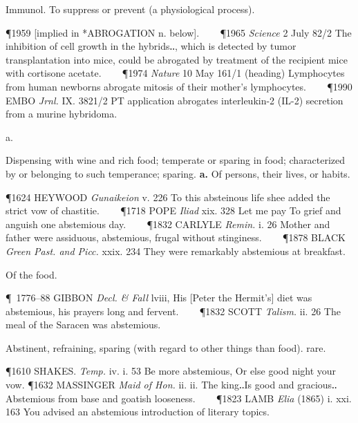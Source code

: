 \begin{description}[wide, labelwidth=!, labelindent=0pt]
\begin{myenumerate}
 Immunol. To suppress or prevent (a physiological process). 

\P 1959 [implied in *ABROGATION n. below].    
\P 1965 \textit{Science} 2 July 82/2 The
inhibition of cell growth in the hybrids‥, which is detected by tumor
transplantation into mice, could be abrogated by treatment of the recipient mice
with cortisone acetate.    
\P 1974 \textit{Nature} 10 May 161/1 (heading) Lymphocytes from
human newborns abrogate mitosis of their mother's lymphocytes.    
\P 1990 EMBO \textit{Jrnl.} IX. 3821/2 PT application abrogates interleukin-2 (IL-2) secretion from a
murine hybridoma.
\end{myenumerate}

 a.

\noindent {}

\vspace{-0.3cm}

\begin{myenumerate}
 Dispensing with wine and rich food; temperate or sparing in food;
characterized by or belonging to such temperance; sparing. \textbf{a.} Of persons,
their lives, or habits. 

\P 1624 HEYWOOD \textit{Gunaikeion} v. 226 To this absteinous life shee added the strict
vow of chastitie.    
\P 1718 POPE \textit{Iliad} xix. 328 Let me pay To grief and anguish
one abstemious day.    
\P 1832 CARLYLE \textit{Remin.} i. 26 Mother and father were
assiduous, abstemious, frugal without stinginess.    
\P 1878 BLACK \textit{Green Past. and Picc.} xxix. 234 They were remarkably abstemious at breakfast.

 Of the food. 

\P 1776–88 GIBBON \textit{Decl. \& Fall} lviii, His [Peter the Hermit's] diet was
abstemious, his prayers long and fervent.    
\P 1832 SCOTT \textit{Talism.} ii. 26 The meal of the Saracen was abstemious.

 Abstinent, refraining, sparing (with regard to other things than food).
rare. 

\P 1610 SHAKES. \textit{Temp.} iv. i. 53 Be more abstemious, Or else good night your vow.
\P 1632 MASSINGER \textit{Maid of Hon.} ii. ii. The king‥Is good and gracious‥Abstemious
from base and goatish looseness.    
\P 1823 LAMB \textit{Elia} (1865) i. xxi. 163 You advised an abstemious introduction 
of literary topics.
\end{myenumerate}



\end{description}
